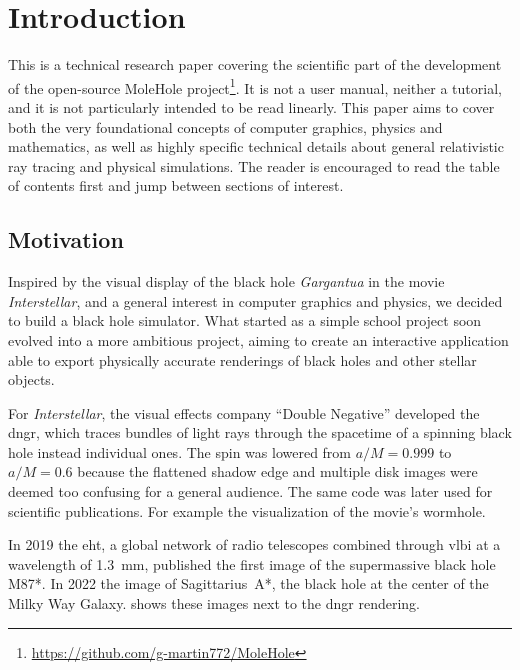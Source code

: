 \chapter{Introduction}\label{ch:introduction}

This is a technical research paper covering the scientific part of the development 
of the open-source MoleHole project\footnote{\url{https://github.com/g-martin772/MoleHole}}. 
It is not a user manual, neither a tutorial, and it is not particularly intended to be read linearly.
This paper aims to cover both the very foundational concepts of computer graphics, physics and mathematics,
as well as highly specific technical details about general relativistic ray tracing and physical simulations.
The reader is encouraged to read the table of contents first and jump between sections of interest.

\section{Motivation}\label{sec:motivation}

Inspired by the visual display of the black hole \emph{Gargantua} in the movie \emph{Interstellar}\cite{Nolan2014Interstellar},
and a general interest in computer graphics and physics, we decided to build a black hole simulator.
What started as a simple school project soon evolved into a more ambitious project,
aiming to create an interactive application able to export physically accurate renderings
of black holes and other stellar objects.

For \emph{Interstellar}, the visual effects company ``Double Negative'' developed the \gls{dngr},
which traces bundles of light rays through the spacetime of a spinning black hole instead individual ones\cite{James15}.
The spin was lowered from $a/M = 0.999$ to $a/M = 0.6$ 
because the flattened shadow edge and multiple disk images
were deemed too confusing for a general audience\cite{James15}.
The same code was later used for scientific publications.
For example the visualization of the movie's wormhole\cite{James15b}.

In 2019 the \gls{eht}, 
a global network of radio telescopes combined through \gls{vlbi} at a wavelength of \SI{1.3}{\milli\metre},
published the first image of the supermassive black hole M87*\cite{EHT19}.
In 2022 the image of Sagittarius~A*, the black hole at the center of the Milky Way Galaxy\cite{EHT22}.
 shows these images next to the \gls{dngr} rendering.

